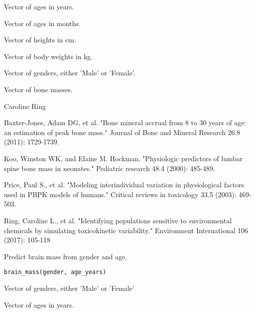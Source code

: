 \documentclass[a4paper]{book}
\begin{document}
\begin{Arguments}
\begin{ldescription}
\item[\code{age\_years}] Vector of ages in years.

\item[\code{age\_months}] Vector of ages in months.

\item[\code{height}] Vector of heights in cm.

\item[\code{weight}] Vector of body weights in kg.

\item[\code{gender}] Vector of genders, either 'Male' or 'Female'.
\end{ldescription}
\end{Arguments}
%
\begin{Value}
Vector of bone masses.
\end{Value}
%
\begin{Author}\relax
Caroline Ring
\end{Author}
%
\begin{References}\relax
Baxter-Jones, Adam DG, et al. "Bone mineral accrual from 8 to 30 years of age: 
an estimation of peak bone mass." Journal of Bone and Mineral Research 26.8 
(2011): 1729-1739.

Koo, Winston WK, and Elaine M. Hockman. "Physiologic predictors of lumbar 
spine bone mass in neonates." Pediatric research 48.4 (2000): 485-489.

Price, Paul S., et al. "Modeling interindividual variation in physiological 
factors used in PBPK models of humans." Critical reviews in toxicology 33.5 
(2003): 469-503.

Ring, Caroline L., et al. "Identifying populations sensitive to
environmental chemicals by simulating toxicokinetic variability."
Environment International 106 (2017): 105-118
\end{References}
%
\begin{Description}\relax
Predict brain mass from gender and age.
\end{Description}
%
\begin{Usage}
\begin{verbatim}
brain_mass(gender, age_years)
\end{verbatim}
\end{Usage}
%
\begin{Arguments}
\begin{ldescription}
\item[\code{gender}] Vector of genders, either 'Male' or 'Female'

\item[\code{age\_years}] Vector of ages in years.
\end{ldescription}
\end{Arguments}
\end{document}
